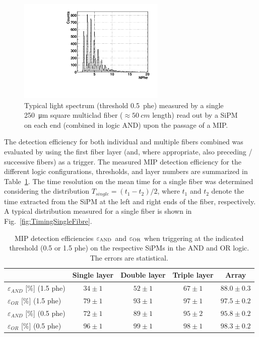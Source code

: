 \begin{refsection}
        \begin{figure}
        	\centering
        	\includegraphics[width=7cm]{Figures/muEDM/prototype/prototype_positrons.pdf}
        	\caption{Typical light spectrum (threshold 0.5~phe) measured by a single \SI{250}{\micro m} square multiclad fiber ($\approx \SI{50}{cm}$ length) read out by a SiPM on each end (combined in logic AND) upon the passage of a MIP.}
        	\label{fig:ChargeSpectrumAND}
        \end{figure}

        \noindent
        The detection efficiency for both individual and multiple fibers combined was evaluated by using the first fiber layer (and, where appropriate, also preceding / successive fibers) as a trigger. The measured MIP detection efficiency for the different logic configurations, thresholds, and layer numbers are summarized in Table~\ref{tab:DetectionEff}.
        The time resolution on the mean time for a single fiber was determined considering the distribution $T_{single} = (t_{1}-t_{2})/2$, where $t_{1}$ and $t_{2}$ denote the time extracted from the SiPM at the left and right ends of the fiber, respectively. A typical distribution measured for a single fiber is shown in Fig.~\ref{fig:TimingSingleFibre}.
        
        \begin{table}
        	\begin{center}
        		\begin{tabular}{l | c | c | c | c } 
        		& Single layer & Double layer& Triple layer & Array  \\ \hline\hline
        			   $\varepsilon_{AND}$ [\%] (1.5 phe)  & $34\pm1$ & $52\pm1$ & $67\pm1$ & $88.0\pm0.3$ \\
        			  $\varepsilon_{OR}$ \hspace{0.13cm} [\%] (1.5 phe)    & $79\pm1$ & $93\pm1$ & $97\pm1$ & $97.5\pm0.2$ \\
        			   $\varepsilon_{AND}$ [\%] (0.5 phe) & $72\pm1$ & $89\pm1$ & $95\pm2$ & $95.8\pm0.2$ \\
        			   $\varepsilon_{OR}$ \hspace{0.13cm} [\%] (0.5 phe)   & $96\pm1$  & $99\pm1$ & $98\pm1$ & $98.3\pm0.2$ 
        		\end{tabular}
        	\end{center}	
        		\caption[Detection efficiencies for m.i.p.]{MIP detection efficiencies $\varepsilon_{\rm AND}$ and $\varepsilon_{\rm OR}$ when triggering at the indicated threshold (0.5 or 1.5 phe) on the respective SiPMs in the AND and OR logic. The errors are statistical.}
        		\label{tab:DetectionEff}
        \end{table}
        

\end{refsection}

